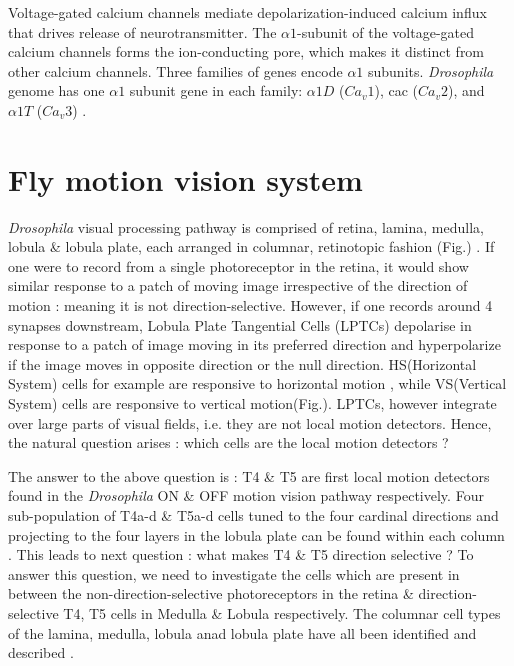 Voltage-gated calcium channels mediate depolarization-induced calcium influx that drives release of neurotransmitter. The $\alpha1$-subunit of the voltage-gated calcium channels forms the ion-conducting pore, which makes it distinct from other calcium channels. Three families of genes encode $\alpha1$ subunits. \textit{Drosophila} genome has one $\alpha1$ subunit gene in each family: $\alpha1D$ ($Ca_{v}1$), cac ($Ca_{v}2$), and $\alpha1T$ ($Ca_{v}3$) \parencite{Littleton2000, King2007}. 


\section{Fly motion vision system}
\textit{Drosophila} visual processing pathway is comprised of retina, lamina, medulla, lobula \& lobula plate, each arranged in columnar, retinotopic fashion (Fig.) \parencite{Fischbach1989}. If one were to record from a single photoreceptor in the retina, it would show similar response to a patch of moving image irrespective of the direction of motion : meaning it is not direction-selective. However, if one records around 4 synapses downstream, Lobula Plate Tangential Cells (LPTCs) depolarise in response to a patch of image moving in its preferred direction and hyperpolarize if the image moves in opposite direction or the null direction. HS(Horizontal System) cells for example are responsive to horizontal motion \parencite{Schnell2010}, while VS(Vertical System) cells are responsive to vertical motion\parencite{Joesch2008}(Fig.). LPTCs, however integrate over large parts of visual fields, i.e. they are not local motion detectors. Hence, the natural question arises : which cells are the local motion detectors ? 

The answer to the above question is : T4 \& T5 are first local motion detectors found in the \textit{Drosophila} ON \& OFF motion vision pathway respectively. Four sub-population of T4a-d \& T5a-d cells tuned to the four cardinal directions and projecting to the four layers in the lobula plate can be found within each column \parencite{Maisak2013}. This leads to next question : what makes T4 \& T5 direction selective ? To answer this question, we need to investigate the cells which are present in between the non-direction-selective photoreceptors in the retina \& direction-selective T4, T5 cells in Medulla \& Lobula respectively. The columnar cell types of the lamina, medulla, lobula anad lobula plate have all been identified and described \parencite{Fischbach1989, RamonyCajal1915}.  

